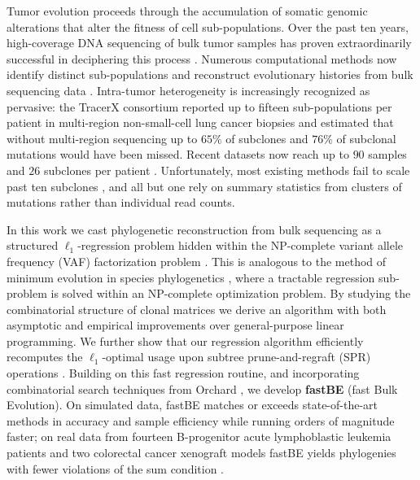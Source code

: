 \documentclass[11pt]{article}
\begin{document}
Tumor evolution proceeds through the accumulation of somatic genomic alterations that alter the fitness of cell sub-populations. Over the past ten years, high-coverage DNA sequencing of bulk tumor samples has proven extraordinarily successful in deciphering this process \cite{gerlinger2012itumor,jamalabadi2020tracerx,nikbakht2020bulk}. Numerous computational methods now identify distinct sub-populations and reconstruct evolutionary histories from bulk sequencing data \cite{elkebir2015ancestree,popic2015lichee,malikic2015citup,deshwar2015phylowgs,satas2017pastri,myers2022calder,wintersinger2022pairtree,kulman2024orchard}. Intra-tumor heterogeneity is increasingly recognized as pervasive: the TracerX consortium \cite{jamalabadi2020tracerx} reported up to fifteen sub-populations per patient in multi-region non-small-cell lung cancer biopsies and estimated that without multi-region sequencing up to $65\%$ of subclones and $76\%$ of subclonal mutations would have been missed. Recent datasets now reach up to $90$ samples and $26$ subclones per patient \cite{dobson2020ball}. Unfortunately, most existing methods fail to scale past ten subclones \cite{wintersinger2022pairtree}, and all but one \cite{kulman2024orchard} rely on summary statistics from clusters of mutations rather than individual read counts.

In this work we cast phylogenetic reconstruction from bulk sequencing as a structured $\ell_1$-regression problem hidden within the NP-complete variant allele frequency (VAF) factorization problem \cite{elkebir2015ancestree}. This is analogous to the method of minimum evolution in species phylogenetics \cite{rzhetsky1993minimumevolution,desper2002minimumevolution}, where a tractable regression sub-problem \cite{lefort2015fastme,price2009fasttree,price2010fasttree2} is solved within an NP-complete optimization problem. By studying the combinatorial structure of clonal matrices \cite{elkebir2015ancestree} we derive an algorithm with both asymptotic and empirical improvements over general-purpose linear programming. We further show that our regression algorithm efficiently recomputes the $\ell_1$-optimal usage upon subtree prune-and-regraft (SPR) operations \cite{spr1996search}. Building on this fast regression routine, and incorporating combinatorial search techniques from Orchard \cite{kulman2024orchard}, we develop \textbf{fastBE} (fast Bulk Evolution). On simulated data, fastBE matches or exceeds state-of-the-art methods in accuracy and sample efficiency while running orders of magnitude faster; on real data from fourteen B-progenitor acute lymphoblastic leukemia patients \cite{dobson2020ball} and two colorectal cancer xenograft models fastBE yields phylogenies with fewer violations of the sum condition \cite{elkebir2015ancestree,popic2015lichee,malikic2015citup}.
\end{document}
